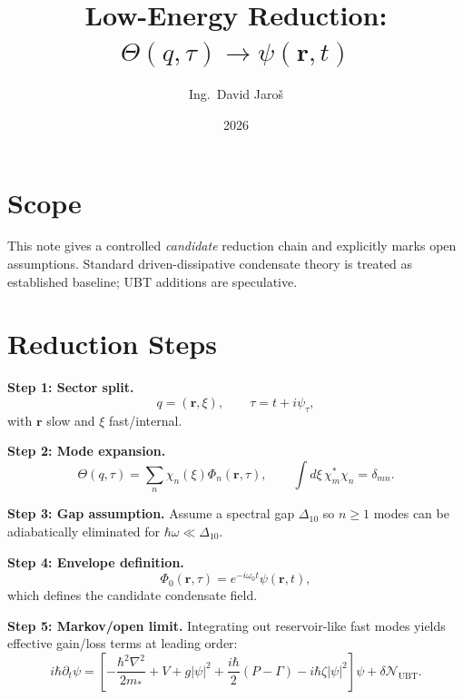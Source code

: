\documentclass[11pt,a4paper]{article}
\title{Low-Energy Reduction: $\Theta(q,\tau)\to\psi(\mathbf r,t)$}
\author{Ing.\ David Jaroš}
\date{2026}
\begin{document}
\maketitle

\section*{Scope}
This note gives a controlled \emph{candidate} reduction chain and explicitly marks open assumptions. Standard driven-dissipative condensate theory is treated as established baseline; UBT additions are speculative.

\section{Reduction Steps}
\textbf{Step 1: Sector split.}
\begin{equation}
q=(\mathbf r,\xi),\qquad \tau=t+i\psi_\tau,
\end{equation}
with $\mathbf r$ slow and $\xi$ fast/internal.

\textbf{Step 2: Mode expansion.}
\begin{equation}
\Theta(q,\tau)=\sum_n\chi_n(\xi)\Phi_n(\mathbf r,\tau),\qquad \int d\xi\,\chi_m^*\chi_n=\delta_{mn}.
\end{equation}

\textbf{Step 3: Gap assumption.}
Assume a spectral gap $\Delta_{10}$ so $n\ge1$ modes can be adiabatically eliminated for $\hbar\omega\ll \Delta_{10}$.

\textbf{Step 4: Envelope definition.}
\begin{equation}
\Phi_0(\mathbf r,\tau)=e^{-i\omega_0 t}\psi(\mathbf r,t),
\end{equation}
which defines the candidate condensate field.

\textbf{Step 5: Markov/open limit.}
Integrating out reservoir-like fast modes yields effective gain/loss terms at leading order:
\begin{equation}
i\hbar\partial_t\psi=\left[-\frac{\hbar^2\nabla^2}{2m_*}+V+g|\psi|^2+\frac{i\hbar}{2}(P-\Gamma)-i\hbar\zeta|\psi|^2\right]\psi+\delta\mathcal N_{\mathrm{UBT}}.
\label{eq:reduced}
\end{equation}
\end{document}
